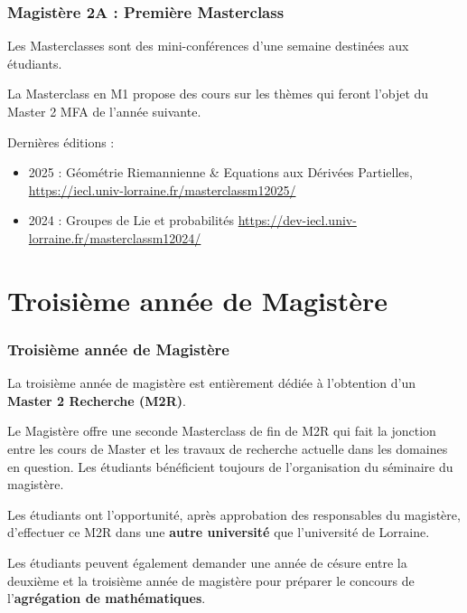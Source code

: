 \documentclass[slidetop,11pt]{beamer}
\begin{document}
\begin{frame}
\frametitle{Magistère 2A : Première Masterclass}

Les Masterclasses sont des mini-conférences d'une semaine destinées aux  étudiants.

La Masterclass en  M1 propose des cours sur les thèmes qui feront l'objet du Master 2 MFA de l'année suivante.

Dernières éditions :
\begin{itemize}
\item 2025 : Géométrie Riemannienne \& Equations aux Dérivées Partielles,  \url{https://iecl.univ-lorraine.fr/masterclassm12025/}
\item 2024 : Groupes de Lie et probabilités \url{https://dev-iecl.univ-lorraine.fr/masterclassm12024/}
\end{itemize}

\end{frame}

\section{Troisième année de Magistère}
\begin{frame}
\frametitle{Troisième année de Magistère}

La troisième année de magistère est entièrement dédiée à l'obtention d'un \textbf{Master 2 Recherche (M2R)}.

Le Magistère offre une seconde Masterclass de fin de M2R qui fait la jonction entre les cours de Master et les travaux de recherche actuelle dans les domaines en question. Les étudiants bénéficient toujours de l'organisation du séminaire du magistère.

\bigskip
Les étudiants ont l'opportunité, après approbation des responsables du magistère, d'effectuer ce M2R dans une \textbf{autre université} que l'université de Lorraine.

\bigskip
Les étudiants peuvent également demander une année de césure entre la deuxième et la troisième année de magistère pour préparer le concours de l'\textbf{agrégation de mathématiques}.

\end{frame}
\end{document}
